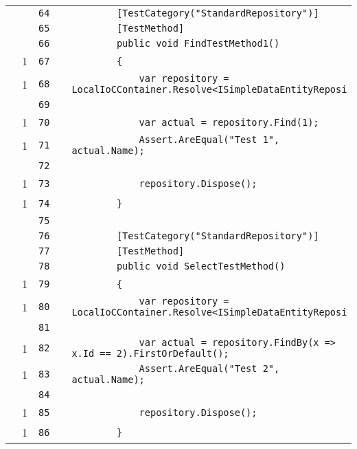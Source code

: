\documentclass[a4paper,10pt]{article}
\begin{document}
\begin{longtable}[l]{lrrll}
\cellcolor{gray} &  & \verb~64~ & & \verb~        [TestCategory("StandardRepository")]~\\
\cellcolor{gray} &  & \verb~65~ & & \verb~        [TestMethod]~\\
\cellcolor{gray} &  & \verb~66~ & & \verb~        public void FindTestMethod1()~\\
\cellcolor{green} & 1 & \verb~67~ & & \verb~        {~\\
\cellcolor{green} & 1 & \verb~68~ & & \verb~            var repository = LocalIoCContainer.Resolve<ISimpleDataEntityReposi~\\
\cellcolor{gray} &  & \verb~69~ & & \verb~~\\
\cellcolor{green} & 1 & \verb~70~ & & \verb~            var actual = repository.Find(1);~\\
\cellcolor{green} & 1 & \verb~71~ & & \verb~            Assert.AreEqual("Test 1", actual.Name);~\\
\cellcolor{gray} &  & \verb~72~ & & \verb~~\\
\cellcolor{green} & 1 & \verb~73~ & & \verb~            repository.Dispose();~\\
\cellcolor{green} & 1 & \verb~74~ & & \verb~        }~\\
\cellcolor{gray} &  & \verb~75~ & & \verb~~\\
\cellcolor{gray} &  & \verb~76~ & & \verb~        [TestCategory("StandardRepository")]~\\
\cellcolor{gray} &  & \verb~77~ & & \verb~        [TestMethod]~\\
\cellcolor{gray} &  & \verb~78~ & & \verb~        public void SelectTestMethod()~\\
\cellcolor{green} & 1 & \verb~79~ & & \verb~        {~\\
\cellcolor{green} & 1 & \verb~80~ & & \verb~            var repository = LocalIoCContainer.Resolve<ISimpleDataEntityReposi~\\
\cellcolor{gray} &  & \verb~81~ & & \verb~~\\
\cellcolor{green} & 1 & \verb~82~ & & \verb~            var actual = repository.FindBy(x => x.Id == 2).FirstOrDefault();~\\
\cellcolor{green} & 1 & \verb~83~ & & \verb~            Assert.AreEqual("Test 2", actual.Name);~\\
\cellcolor{gray} &  & \verb~84~ & & \verb~~\\
\cellcolor{green} & 1 & \verb~85~ & & \verb~            repository.Dispose();~\\
\cellcolor{green} & 1 & \verb~86~ & & \verb~        }~\\

\end{longtable}
\end{document}

